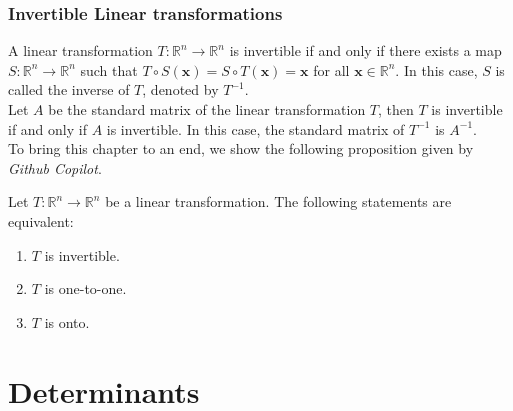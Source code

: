 \documentclass[10pt, a4paper]{article}
\begin{document}
\subsubsection*{Invertible Linear transformations}
A linear transformation $T: \mathbb{R}^n \rightarrow \mathbb{R}^n$ is invertible if and only if there exists a map $S: \mathbb{R}^n \rightarrow \mathbb{R}^n$ such that $T\circ S (\mathbf{x}) = S\circ T (\mathbf{x}) = \mathbf{x}$ for all $\mathbf{x} \in \mathbb{R}^n$. In this case, $S$ is called the inverse of $T$, denoted by $T^{-1}$.\\
\indent Let $A$ be the standard matrix of the linear transformation $T$, then $T$ is invertible if and only if $A$ is invertible. In this case, the standard matrix of $T^{-1}$ is $A^{-1}$.\\
\indent To bring this chapter to an end, we show the following proposition given by \textit{Github Copilot}.
\begin{proposition}
    Let $T: \mathbb{R}^n \rightarrow \mathbb{R}^n$ be a linear transformation. The following statements are equivalent:
    \begin{enumerate}
        \item $T$ is invertible.
        \item $T$ is one-to-one.
        \item $T$ is onto.
    \end{enumerate}
\end{proposition}


\newpage

\section{Determinants}
\end{document}
